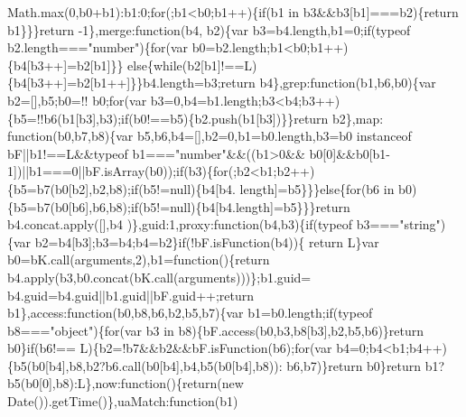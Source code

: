 \begin{DoxyCode}
      Math.max(0,b0+b1):b1:0;\textcolor{keywordflow}{for}(;b1<b0;b1++)\{\textcolor{keywordflow}{if}(b1 in b3&&b3[b1]===b2)\{\textcolor{keywordflow}{return} b1\}\}\}\textcolor{keywordflow}{return} -1\},merge:\textcolor{keyword}{function}(b4,
      b2)\{var b3=b4.length,b1=0;\textcolor{keywordflow}{if}(typeof b2.length===\textcolor{stringliteral}{"number"})\{\textcolor{keywordflow}{for}(var b0=b2.length;b1<b0;b1++)\{b4[b3++]=b2[b1]\}\}\textcolor{keywordflow}{
      else}\{\textcolor{keywordflow}{while}(b2[b1]!==L)\{b4[b3++]=b2[b1++]\}\}b4.length=b3;\textcolor{keywordflow}{return} b4\},grep:\textcolor{keyword}{function}(b1,b6,b0)\{var b2=[],b5;b0=!!
      b0;\textcolor{keywordflow}{for}(var b3=0,b4=b1.length;b3<b4;b3++)\{b5=!!b6(b1[b3],b3);\textcolor{keywordflow}{if}(b0!==b5)\{b2.push(b1[b3])\}\}\textcolor{keywordflow}{return} b2\},map:\textcolor{keyword}{
      function}(b0,b7,b8)\{var b5,b6,b4=[],b2=0,b1=b0.length,b3=b0 instanceof bF||b1!==L&&typeof b1===\textcolor{stringliteral}{"number"}&&((b1>0&&
      b0[0]&&b0[b1-1])||b1===0||bF.isArray(b0));\textcolor{keywordflow}{if}(b3)\{\textcolor{keywordflow}{for}(;b2<b1;b2++)\{b5=b7(b0[b2],b2,b8);\textcolor{keywordflow}{if}(b5!=null)\{b4[b4.
      length]=b5\}\}\}\textcolor{keywordflow}{else}\{\textcolor{keywordflow}{for}(b6 in b0)\{b5=b7(b0[b6],b6,b8);\textcolor{keywordflow}{if}(b5!=null)\{b4[b4.length]=b5\}\}\}\textcolor{keywordflow}{return} b4.concat.apply([],b4
      )\},guid:1,proxy:\textcolor{keyword}{function}(b4,b3)\{\textcolor{keywordflow}{if}(typeof b3===\textcolor{stringliteral}{"string"})\{var b2=b4[b3];b3=b4;b4=b2\}\textcolor{keywordflow}{if}(!bF.isFunction(b4))\{\textcolor{keywordflow}{
      return} L\}var b0=bK.call(arguments,2),b1=\textcolor{keyword}{function}()\{\textcolor{keywordflow}{return} b4.apply(b3,b0.concat(bK.call(arguments)))\};b1.guid=
      b4.guid=b4.guid||b1.guid||bF.guid++;\textcolor{keywordflow}{return} b1\},access:\textcolor{keyword}{function}(b0,b8,b6,b2,b5,b7)\{var b1=b0.length;\textcolor{keywordflow}{if}(typeof
       b8===\textcolor{stringliteral}{"object"})\{\textcolor{keywordflow}{for}(var b3 in b8)\{bF.access(b0,b3,b8[b3],b2,b5,b6)\}\textcolor{keywordflow}{return} b0\}\textcolor{keywordflow}{if}(b6!==
      L)\{b2=!b7&&b2&&bF.isFunction(b6);\textcolor{keywordflow}{for}(var b4=0;b4<b1;b4++)\{b5(b0[b4],b8,b2?b6.call(b0[b4],b4,b5(b0[b4],b8)):
      b6,b7)\}\textcolor{keywordflow}{return} b0\}\textcolor{keywordflow}{return} b1?b5(b0[0],b8):L\},now:\textcolor{keyword}{function}()\{\textcolor{keywordflow}{return}(\textcolor{keyword}{new} Date()).getTime()\},uaMatch:\textcolor{keyword}{function}(b1)

\end{DoxyCode}
